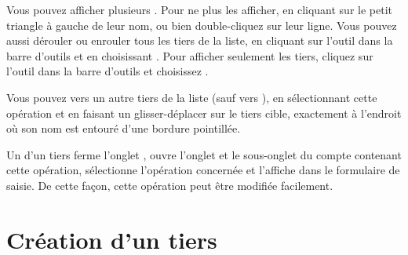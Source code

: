
Vous pouvez afficher plusieurs . Pour ne plus les afficher,  en cliquant sur le petit triangle à gauche de leur nom, ou bien double-cliquez sur leur ligne. Vous pouvez aussi dérouler ou enrouler tous les tiers de la liste, en cliquant sur l'outil  dans la barre d'outils et en choisissant . Pour afficher seulement les tiers, cliquez sur l'outil  dans la barre d'outils et choisissez .

Vous pouvez  vers un autre tiers de la liste (sauf vers ), en sélectionnant cette opération et en faisant un glisser-déplacer sur le tiers cible, exactement à l'endroit où son nom est entouré d'une bordure pointillée.

Un  d'un tiers ferme l'onglet , ouvre l'onglet  et le sous-onglet du compte contenant cette opération, sélectionne l'opération concernée et l'affiche dans le formulaire de saisie. De cette façon, cette opération peut être modifiée facilement.


\section{Création d'un tiers\label{thirdparties-new}}


\ifIllustration
\label{thirdparties-new-img}
\fi

